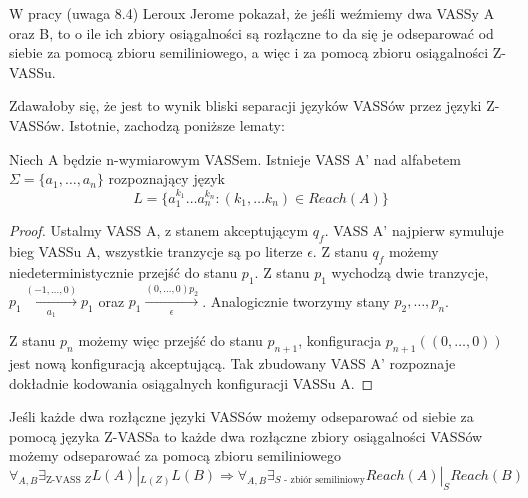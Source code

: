     W pracy \cite{reach_sep_jerome} (uwaga 8.4)  Leroux Jerome
    pokazał, że jeśli weźmiemy dwa VASSy A oraz B, to o ile ich zbiory osiągalności są rozłączne to da się je odseparować
    od siebie za pomocą zbioru semiliniowego, a więc i za pomocą zbioru osiągalności Z-VASSu.

    Zdawałoby się, że jest to wynik bliski separacji języków VASSów przez języki Z-VASSów.
    Istotnie, zachodzą poniższe lematy:
    \begin{lemma}
        \label{reach_language}
        Niech A będzie n-wymiarowym VASSem.
        Istnieje VASS A'  nad alfabetem $\Sigma=\{a_1,\dots,a_n\}$ rozpoznający język
        \[L=\{a_{1}^{k_1} \dots a_{n}^{k_n}:(k_1, \dots k_n) \in Reach(A)\}\]
    \end{lemma}
    \begin{proof}
        Ustalmy VASS A, z stanem akceptującym $q_f$.
        VASS A' najpierw symuluje bieg VASSu A, wszystkie tranzycje są po literze $\epsilon$.
        Z stanu $q_f$ możemy niedeterministycznie przejść do stanu $p_1$.
        Z stanu $p_1$ wychodzą dwie tranzycje, $p_1 \xrightarrow[a_1]{(-1,\dots,0)} p_1$ oraz $p_1 \xrightarrow[\epsilon]{(0,\dots,0) p_2}$.
        Analogicznie tworzymy stany $p_2,\dots, p_n$.

        Z stanu $p_n$ możemy więc przejść do stanu $p_{n+1}$, konfiguracja $p_{n+1}((0, \dots, 0))$ jest nową konfiguracją akceptującą.
        Tak zbudowany VASS A' rozpoznaje dokładnie kodowania osiągalnych konfiguracji VASSu A.
    \end{proof}
    \begin{lemma}
        Jeśli każde dwa rozłączne języki VASSów możemy odseparować od siebie za pomocą języka Z-VASSa to każde dwa rozłączne
        zbiory osiągalności VASSów możemy odseparować za pomocą zbioru semiliniowego
        \[\forall_{A,B}\exists_{\text{Z-VASS }Z} L(A) |_{L(Z)} L(B) \Rightarrow \forall_{A,B} \exists_{S\text{ - zbiór semiliniowy}} Reach(A) |_S Reach(B)\]
    \end{lemma}
